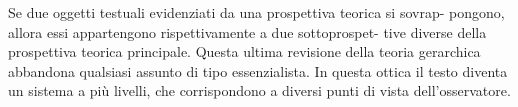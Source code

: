 
Se due oggetti testuali evidenziati da una prospettiva teorica si sovrap- pongono, allora essi appartengono rispettivamente a due sottoprospet- tive diverse della prospettiva teorica principale. Questa ultima revisione della teoria gerarchica abbandona qualsiasi assunto di tipo essenzialista. In questa ottica il testo diventa un sistema a più livelli, che corrispondono a diversi punti di vista dell’osservatore.



